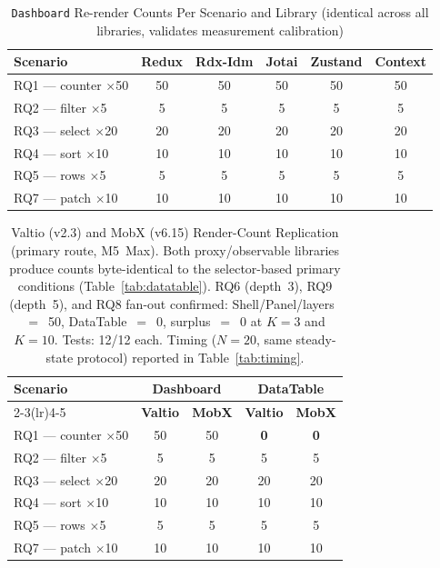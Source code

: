\documentclass[conference]{IEEEtran}
\newcommand{\code}[1]{\texttt{\small #1}}
\begin{document}
\begin{table}[tb]
\caption{\code{Dashboard} Re-render Counts Per Scenario and Library
(identical across all libraries, validates measurement calibration)}
\label{tab:dashboard}
\begin{center}
\small
\setlength{\tabcolsep}{4pt}
\begin{tabular}{lccccc}
\toprule
\textbf{Scenario}             & \textbf{Redux} & \textbf{Rdx-Idm}
                              & \textbf{Jotai} & \textbf{Zustand} & \textbf{Context} \\
\midrule
RQ1 --- counter $\times$50   & 50 & 50 & 50 & 50 & 50 \\
RQ2 --- filter $\times$5     & 5  & 5  & 5  & 5  & 5  \\
RQ3 --- select $\times$20    & 20 & 20 & 20 & 20 & 20 \\
RQ4 --- sort $\times$10      & 10 & 10 & 10 & 10 & 10 \\
RQ5 --- rows $\times$5       & 5  & 5  & 5  & 5  & 5  \\
RQ7 --- patch $\times$10     & 10 & 10 & 10 & 10 & 10 \\
\bottomrule
\end{tabular}
\end{center}
\end{table}

\begin{table}[tb]
\caption{Valtio (v2.3) and MobX (v6.15) Render-Count Replication
  (primary route, M5~Max). Both proxy/observable libraries produce
  counts byte-identical to the selector-based primary conditions
  (Table~\ref{tab:datatable}). RQ6 (depth~3), RQ9 (depth~5), and
  RQ8 fan-out confirmed: Shell/Panel/layers~$=$~50, DataTable~$=$~0,
  surplus~$=$~0 at $K{=}3$ and $K{=}10$. Tests: 12/12 each.
  Timing ($N{=}20$, same steady-state protocol) reported in Table~\ref{tab:timing}.}
\label{tab:replications}
\begin{center}
\small
\setlength{\tabcolsep}{4pt}
\begin{tabular}{lcccc}
\toprule
\textbf{Scenario}
  & \multicolumn{2}{c}{\textbf{Dashboard}}
  & \multicolumn{2}{c}{\textbf{DataTable}} \\
\cmidrule(lr){2-3}\cmidrule(lr){4-5}
  & \textbf{Valtio} & \textbf{MobX}
  & \textbf{Valtio} & \textbf{MobX} \\
\midrule
RQ1 --- counter $\times$50   & 50 & 50 & \textbf{0} & \textbf{0} \\
RQ2 --- filter $\times$5     & 5  & 5  & 5  & 5  \\
RQ3 --- select $\times$20    & 20 & 20 & 20 & 20 \\
RQ4 --- sort $\times$10      & 10 & 10 & 10 & 10 \\
RQ5 --- rows $\times$5       & 5  & 5  & 5  & 5  \\
RQ7 --- patch $\times$10     & 10 & 10 & 10 & 10 \\
\bottomrule
\end{tabular}
\end{center}
\end{table}
\end{document}
